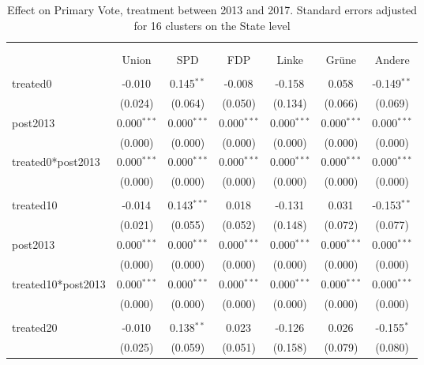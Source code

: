 \documentclass[12pt]{article}
\begin{document}
 
\begin{table}[!htbp] \centering
  \caption{Effect on Primary Vote, treatment between 2013 and 2017. Standard errors adjusted for 16 clusters on the State level}
\begin{tabular}{@{\extracolsep{5pt}}lcccccc}
\\[-1.8ex]\hline
\hline \\[-1.8ex]
\\[-1.8ex] & \multicolumn{1}{c}{Union} & \multicolumn{1}{c}{SPD} & \multicolumn{1}{c}{FDP} & \multicolumn{1}{c}{Linke} & \multicolumn{1}{c}{Grüne} & \multicolumn{1}{c}{Andere}  \\
\hline \\[-1.8ex]
 treated0 & -0.010$^{}$ & 0.145$^{**}$ & -0.008$^{}$ & -0.158$^{}$ & 0.058$^{}$ & -0.149$^{**}$ \\
  & (0.024) & (0.064) & (0.050) & (0.134) & (0.066) & (0.069) \\
 post2013 & 0.000$^{***}$ & 0.000$^{***}$ & 0.000$^{***}$ & 0.000$^{***}$ & 0.000$^{***}$ & 0.000$^{***}$ \\
  & (0.000) & (0.000) & (0.000) & (0.000) & (0.000) & (0.000) \\
 treated0*post2013 & 0.000$^{***}$ & 0.000$^{***}$ & 0.000$^{***}$ & 0.000$^{***}$ & 0.000$^{***}$ & 0.000$^{***}$ \\
  & (0.000) & (0.000) & (0.000) & (0.000) & (0.000) & (0.000) \\
\hline \\[-1.8ex]
 treated10 & -0.014$^{}$ & 0.143$^{***}$ & 0.018$^{}$ & -0.131$^{}$ & 0.031$^{}$ & -0.153$^{**}$ \\
  & (0.021) & (0.055) & (0.052) & (0.148) & (0.072) & (0.077) \\
 post2013 & 0.000$^{***}$ & 0.000$^{***}$ & 0.000$^{***}$ & 0.000$^{***}$ & 0.000$^{***}$ & 0.000$^{***}$ \\
  & (0.000) & (0.000) & (0.000) & (0.000) & (0.000) & (0.000) \\
 treated10*post2013 & 0.000$^{***}$ & 0.000$^{***}$ & 0.000$^{***}$ & 0.000$^{***}$ & 0.000$^{***}$ & 0.000$^{***}$ \\
  & (0.000) & (0.000) & (0.000) & (0.000) & (0.000) & (0.000) \\
\hline \\[-1.8ex]
 treated20 & -0.010$^{}$ & 0.138$^{**}$ & 0.023$^{}$ & -0.126$^{}$ & 0.026$^{}$ & -0.155$^{*}$ \\
  & (0.025) & (0.059) & (0.051) & (0.158) & (0.079) & (0.080) \\

\end{tabular}
\end{table}
\end{document}
